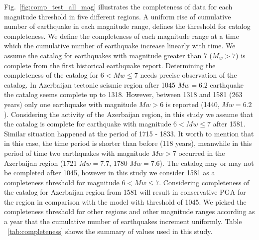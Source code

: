 \noindent
Fig.~\ref{fig:comp_test_all_mag} illustrates the completeness of data for each magnitude threshold in five different regions. A uniform rise of cumulative number of earthquake in each magnitude range, defines the threshold for catalog completeness. We define the completeness of each magnitude range at a time which the cumulative number of earthquake increase linearly with time. We assume the catalog for earthquakes with magnitude greater than  7 ($M_w > 7$) is complete from the first historical earthquake report.  Determining the completeness of the catalog for $ 6 < Mw \leq 7 $ needs precise observation of the catalog. In Azerbaijan tectonic seismic region after 1045  $Mw = 6.2$ earthquake the catalog seems complete up to 1318. However, between 1318 and 1581 (263 years) only one earthquake with magnitude $Mw > 6$ is reported (1440,  $Mw = 6.2$ ). Considering the activity of the Azerbaijan region, in this study we assume that the catalog is complete for earthquake with magnitude $ 6 < Mw \leq 7 $ after 1581. Similar situation happened at the period of 1715 - 1833. It worth to mention that in this case, the time period is shorter than before (118 years), meanwhile in this period of time two earthquakes with magnitude $Mw>7$ occurred in the Azerbaijan region (1721 $Mw=7.7$, 1780 $Mw=7.6$). The catalog may or may not be completed after 1045, however in this study we consider 1581 as a completeness threshold for magnitude  $ 6 < Mw \leq 7 $. Considering completeness of the catalog for Azerbaijan region from 1581 will result in conservative PGA for the region in comparison with the model with threshold of 1045. We picked the completeness threshold for other regions and other magnitude ranges according as a year that the cumulative number of earthquakes increment uniformly. Table ~\ref{tab:completeness} shows the summary of values used in this study.


